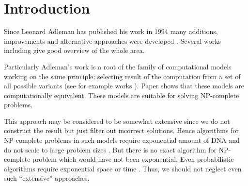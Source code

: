 \section{Introduction}

Since Leonard Adleman has published his work \cite{Adleman:1994} in 1994 many additions, improvements and alternative approaches were developed \cite{Amos:2002, Dantsin:2003, Rozenberg:knapsack, Lipton:1994, Paun:2002}. Several works including \cite{Amos:2003:Book, Amos:2002, PaunRozenbergSalomaa:1998} give good overview of the whole area.

Particularly Adleman's work is a root of the family of computational models working on the same principle: selecting result of the computation from a set of all possible variants (see for example works \cite{Adleman:1996, Amos:1996, Liu:1996, Rozenberg:2003}). Paper \cite{Katsanyi:2003} shows that these models are computationally equivalent. These models are suitable for solving NP-complete problems.

This approach may be considered to be somewhat extensive since we do not construct the result but just filter out incorrect solutions. Hence algorithms for NP-complete problems in such models require exponential amount of DNA and do not scale to large problem sizes \cite{Hartmanis:1995}. But there is no exact algorithm for NP-complete problem which would have not been exponential. Even probabilistic algorithms require exponential space or time \cite{Liu:2005}. Thus, we should not neglect even such ``extensive'' approaches.

